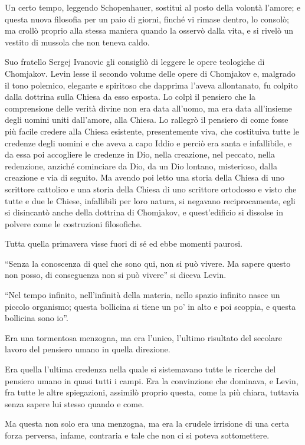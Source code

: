 Un certo tempo, leggendo Schopenhauer, sostituì al posto della volontà l'amore; e questa nuova filosofia per un paio di giorni, finché vi rimase dentro, lo consolò; ma crollò proprio alla stessa maniera quando la osservò dalla vita, e si rivelò un vestito di mussola che non teneva caldo. 

Suo fratello Sergej Ivanovic gli consigliò di leggere le opere teologiche di Chomjakov. Levin lesse il secondo volume delle opere di Chomjakov e, malgrado il tono polemico, elegante e spiritoso che dapprima l'aveva allontanato, fu colpito dalla dottrina sulla Chiesa da esso esposta. Lo colpì il pensiero che la comprensione delle verità divine non era data all'uomo, ma era data all'insieme degli uomini uniti dall'amore, alla Chiesa. Lo rallegrò il pensiero di come fosse più facile credere alla Chiesa esistente, presentemente viva, che costituiva tutte le credenze degli uomini e che aveva a capo Iddio e perciò era santa e infallibile, e da essa poi accogliere le credenze in Dio, nella creazione, nel peccato, nella redenzione, anziché cominciare da Dio, da un Dio lontano, misterioso, dalla creazione e via di seguito. Ma avendo poi letto una storia della Chiesa di uno scrittore cattolico e una storia della Chiesa di uno scrittore ortodosso e visto che tutte e due le Chiese, infallibili per loro natura, si negavano reciprocamente, egli si disincantò anche della dottrina di Chomjakov, e quest'edificio si dissolse in polvere come le costruzioni filosofiche. 

Tutta quella primavera visse fuori di sé ed ebbe momenti paurosi. 

``Senza la conoscenza di quel che sono qui, non si può vivere. Ma sapere questo non posso, di conseguenza non si può vivere'' si diceva Levin. 

``Nel tempo infinito, nell'infinità della materia, nello spazio infinito nasce un piccolo organismo; questa bollicina si tiene un po' in alto e poi scoppia, e questa bollicina sono io''. 

Era una tormentosa menzogna, ma era l'unico, l'ultimo risultato del secolare lavoro del pensiero umano in quella direzione. 

Era quella l'ultima credenza nella quale si sistemavano tutte le ricerche del pensiero umano in quasi tutti i campi. Era la convinzione che dominava, e Levin, fra tutte le altre spiegazioni, assimilò proprio questa, come la più chiara, tuttavia senza sapere lui stesso quando e come. 

Ma questa non solo era una menzogna, ma era la crudele irrisione di una certa forza perversa, infame, contraria e tale che non ci si poteva sottomettere. 

